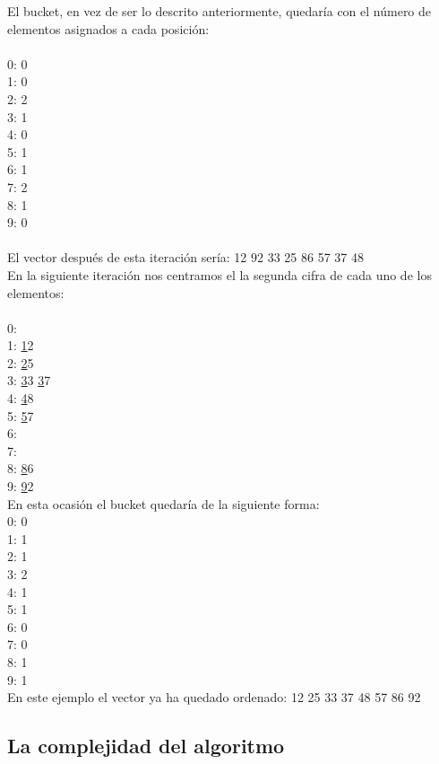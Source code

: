 El bucket, en vez de ser lo descrito anteriormente, quedaría con el número de elementos asignados a cada posición:\\
\\
0: 0\\
1: 0\\
2: 2\\
3: 1\\
4: 0\\
5: 1\\
6: 1\\
7: 2\\
8: 1\\
9: 0\\
\\

El vector después de esta iteración sería: 12 92 33 25 86 57 37 48\\

En la siguiente iteración nos centramos el la segunda cifra de cada uno de los elementos:\\
\\
0:\\
1: \underline{1}2\\
2: \underline{2}5\\
3: \underline{3}3 \underline{3}7\\
4: \underline{4}8\\
5: \underline{5}7\\
6: \\
7: \\
8: \underline{8}6\\
9: \underline{9}2\\

En esta ocasión el bucket quedaría de la siguiente forma:
\\
0: 0\\
1: 1\\
2: 1\\
3: 2\\
4: 1\\
5: 1\\
6: 0\\
7: 0\\
8: 1\\
9: 1\\

En este ejemplo el vector ya ha quedado ordenado: 12 25 33 37 48 57 86 92\\



\subsection{La complejidad del algoritmo}
